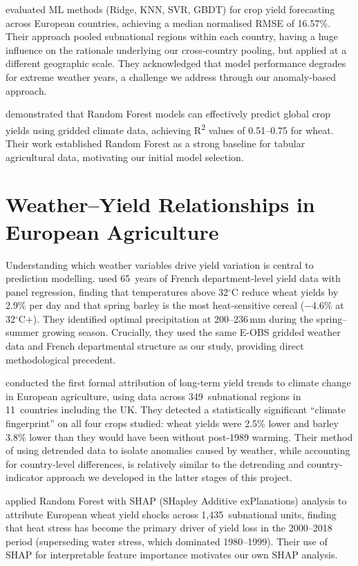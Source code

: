 \documentclass[12pt,a4paper]{report}
\newcommand{\rsq}{R\textsuperscript{2}}
\newcommand{\degrees}{$^{\circ}$C}
\begin{document}
\citet{paudel2021} evaluated ML methods (Ridge, KNN, SVR, GBDT) for crop yield forecasting across European countries, achieving a median normalised RMSE of 16.57\%. Their approach pooled subnational regions within each country, having a huge influence on the rationale underlying our cross-country pooling, but applied at a different geographic scale. They acknowledged that model performance degrades for extreme weather years, a challenge we address through our anomaly-based approach.

\citet{jeong2016} demonstrated that Random Forest models can effectively predict global crop yields using gridded climate data, achieving \rsq{} values of 0.51--0.75 for wheat. Their work established Random Forest as a strong baseline for tabular agricultural data, motivating our initial model selection.

\section{Weather--Yield Relationships in European Agriculture}

Understanding which weather variables drive yield variation is central to prediction modelling. \citet{gammans2017} used 65~years of French department-level yield data with panel regression, finding that temperatures above 32\degrees{} reduce wheat yields by 2.9\% per day and that spring barley is the most heat-sensitive cereal ($-4.6$\% at 32\degrees{}+). They identified optimal precipitation at 200--236\,mm during the spring--summer growing season. Crucially, they used the same E-OBS gridded weather data and French departmental structure as our study, providing direct methodological precedent.

\citet{moore2015} conducted the first formal attribution of long-term yield trends to climate change in European agriculture, using data across 349~subnational regions in 11~countries including the UK. They detected a statistically significant ``climate fingerprint'' on all four crops studied: wheat yields were 2.5\% lower and barley 3.8\% lower than they would have been without post-1989 warming. Their method of using detrended data to isolate anomalies caused by weather, while accounting for country-level differences, is relatively similar to the detrending and country-indicator approach we developed in the latter stages of this project.

\citet{zhu2021} applied Random Forest with SHAP (SHapley Additive exPlanations) analysis to attribute European wheat yield shocks across 1,435~subnational units, finding that heat stress has become the primary driver of yield loss in the 2000--2018 period (superseding water stress, which dominated 1980--1999). Their use of SHAP for interpretable feature importance motivates our own SHAP analysis.
\end{document}
